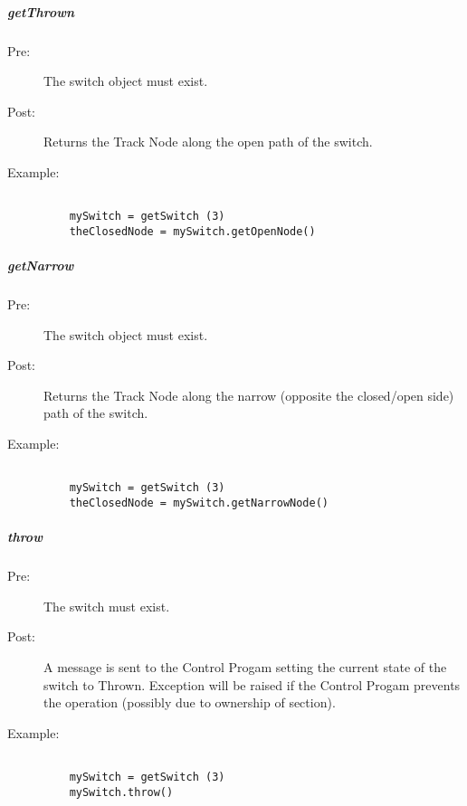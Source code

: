 \documentclass[a4paper,11pt,notitlepage]{article}
\def\CS{Control Progam\xspace}
\def\TN{Track Node\xspace}
\begin{document}
\subparagraph{getThrown}
\begin{description}
\item[\hspace{1cm}Pre:] The switch object must exist.
\item[\hspace{1cm}Post:] Returns the \TN along the open path of the switch.
\item[\hspace{1cm}Example:]
\begin{verbatim}

    mySwitch = getSwitch (3)
    theClosedNode = mySwitch.getOpenNode()
\end{verbatim}
\end{description}

\subparagraph{getNarrow}
\begin{description}
\item[\hspace{1cm}Pre:] The switch object must exist.
\item[\hspace{1cm}Post:] Returns the \TN along the narrow (opposite the closed/open side) path of the switch.
\item[\hspace{1cm}Example:]
\begin{verbatim}

    mySwitch = getSwitch (3)
    theClosedNode = mySwitch.getNarrowNode()
\end{verbatim}
\end{description}

\subparagraph{throw}
\begin{description}
\item[\hspace{1cm}Pre:] The switch must exist.
\item[\hspace{1cm}Post:] A message is sent to the \CS setting the current state of the switch to Thrown. Exception will be raised if the \CS prevents the operation (possibly due to ownership of section).
\item[\hspace{1cm}Example:]
\begin{verbatim}

    mySwitch = getSwitch (3)
    mySwitch.throw()
\end{verbatim}
\end{description}
\end{document}
